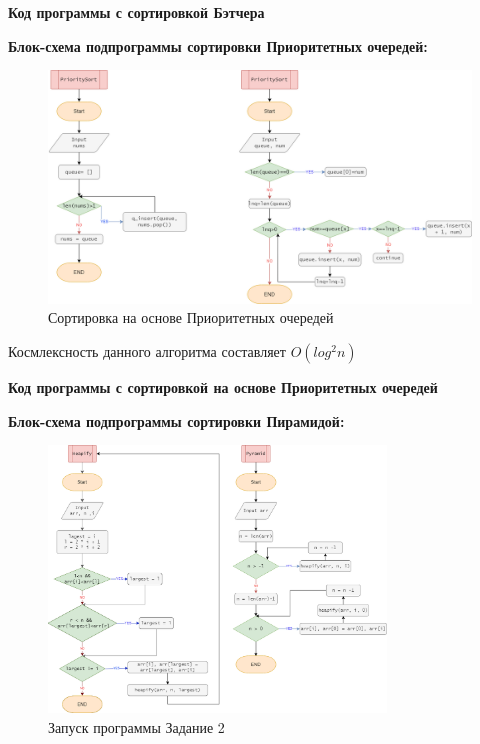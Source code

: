 \textbf{Код программы с сортировкой Бэтчера}





\textbf{Блок-схема подпрограммы сортировки Приоритетных очередей:}




\begin{figure}[H]
    \centering
    \includegraphics[width=1\textwidth]{./flowcharts/priority.drawio.png}
    \caption{Сортировка на основе Приоритетных очередей}
\end{figure}

Космлексность данного алгоритма составляет $O(log^2{n})$

\textbf{Код программы с сортировкой на основе Приоритетных очередей}




\textbf{Блок-схема подпрограммы сортировки Пирамидой:}



\begin{figure}[H]
    \centering
    \includegraphics[width=0.8\textwidth]{./flowcharts/pyramid.drawio.png}
    \caption{Запуск программы Задание 2}
\end{figure}

